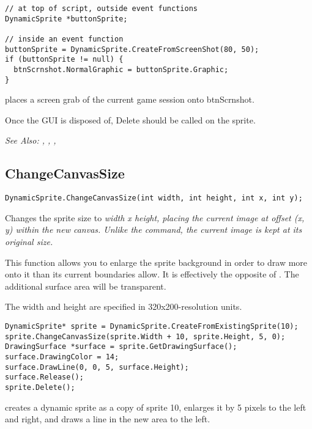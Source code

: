 \begin{verbatim}
// at top of script, outside event functions
DynamicSprite *buttonSprite;

// inside an event function
buttonSprite = DynamicSprite.CreateFromScreenShot(80, 50);
if (buttonSprite != null) {
  btnScrnshot.NormalGraphic = buttonSprite.Graphic;
}
\end{verbatim}
places a screen grab of the current game session onto btnScrnshot.

Once the GUI is disposed of, Delete should be called on the sprite.

\it{See Also:} ,
,
,


\subsection{ChangeCanvasSize}\label{DynamicSprite.ChangeCanvasSize}%

\begin{verbatim}
DynamicSprite.ChangeCanvasSize(int width, int height, int x, int y);
\end{verbatim}
Changes the sprite size to \it{width} x \it{height}, placing the current image
at offset (x, y) within the new canvas. Unlike the 
command, the current image is kept at its original size.

This function allows you to enlarge the sprite background in order to draw
more onto it than its current boundaries allow. It is effectively the
opposite of . The additional surface area
will be transparent.

The width and height are specified in 320x200-resolution units.

\begin{verbatim}
DynamicSprite* sprite = DynamicSprite.CreateFromExistingSprite(10);
sprite.ChangeCanvasSize(sprite.Width + 10, sprite.Height, 5, 0);
DrawingSurface *surface = sprite.GetDrawingSurface();
surface.DrawingColor = 14;
surface.DrawLine(0, 0, 5, surface.Height);
surface.Release();
sprite.Delete();
\end{verbatim}
creates a dynamic sprite as a copy of sprite 10, enlarges it by 5 pixels to the
left and right, and draws a line in the new area to the left.

